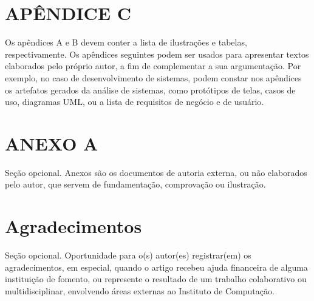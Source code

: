 \documentclass[article,a4paper,12pt,brazil,sumario=tradicional]{abntex2}
\begin{document}
\newpage


\newpage
\renewcommand{\listfigurename}{APÊNDICE A - Lista de ilustrações}
\listoffigures

\newpage
\renewcommand{\listtablename}{APÊNDICE B - Lista de tabelas}
\listoftables

\begin{appendices}
\newpage
\chapter* {APÊNDICE C}
\noindent
Os apêndices A e B devem conter a lista de ilustrações e tabelas, respectivamente. Os apêndices seguintes podem ser usados para apresentar textos elaborados pelo próprio autor, a fim de complementar a sua argumentação. Por exemplo, no caso de desenvolvimento de sistemas, podem constar nos apêndices os artefatos gerados da análise de sistemas, como protótipos de telas, casos de uso, diagramas UML, ou a lista de requisitos de negócio e de usuário.

\newpage
\chapter*{ANEXO A}
\noindent
Seção opcional. Anexos são os documentos de autoria externa, ou não elaborados pelo autor, que servem de fundamentação, comprovação ou ilustração.
\end{appendices}

\newpage
\chapter*{Agradecimentos}
\noindent
Seção opcional. Oportunidade para o(s) autor(es) registrar(em) os agradecimentos, em especial, quando o artigo recebeu ajuda financeira de alguma instituição de fomento, ou represente o resultado de um trabalho colaborativo ou multidisciplinar, envolvendo áreas externas ao Instituto de Computação.
\end{document}
